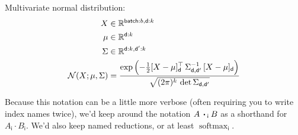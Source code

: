 \documentclass{article}
\newcommand{\name}[1]{\mathsf{#1}}
\newcommand{\ndot}[1]{\mathbin{\mathop{\thinspace\boldsymbol\cdot\thinspace}\displaylimits_{\name{#1}}}}
\DeclareMathOperator*{\softmax}{softmax}
\begin{document}
Multivariate normal distribution:
\begin{align*} 
X &\in \mathbb{R}^{\name{batch}:{b}, \name{d}:{k}}  \\
\mu &\in \mathbb{R}^{{\name{d}:{k}}}  \\
\Sigma & \in   \mathbb{R}^{{\name{d}:{k}, \name{d'}:{k}}}  \\
{\cal N}(X; \mu, \Sigma) &= \frac{\displaystyle \exp\left(-\tfrac{1}{2} [X - \mu]_{\name{d}}^\top \, \Sigma_{\name{d},\name{d'}}^{-1} \, [X - \mu]_{\name{d}} \right) }{\sqrt{(2 \pi)^k \, \mathop{\text{det}} \Sigma_{\name{d},\name{d'}}} }
\end{align*}

Because this notation can be a little more verbose (often requiring you to write index names twice), we'd keep around the notation $A \ndot{i} B$ as a shorthand for $A_{\name{i}} \cdot B_{\name{i}}$. We'd also keep named reductions, or at least $\softmax_{\name{i}}$.



\end{document}
